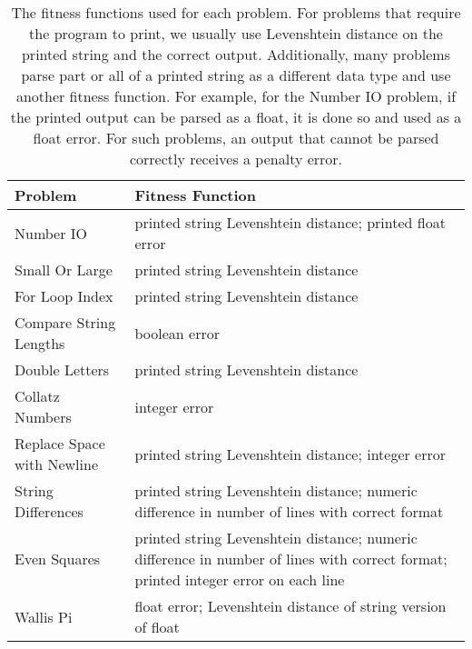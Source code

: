 \documentclass{sig-alternate}
\begin{document}
\begin{table*}[t]
\centering
\caption{The fitness functions used for each problem. For problems that require the program to print, we usually use Levenshtein distance on the printed string and the correct output. Additionally, many problems parse part or all of a printed string as a different data type and use another fitness function. For example, for the Number IO problem, if the printed output can be parsed as a float, it is done so and used as a float error. For such problems, an output that cannot be parsed correctly receives a penalty error.}
\label{tableFitnessFunctions}
\begin{tabular}{>{\raggedright}p{4cm} >{\raggedright}p{11cm}}
\toprule
\textbf{Problem}               & \textbf{Fitness Function}                                                                                                                        \tabularnewline
\midrule
Number IO                  & printed string Levenshtein distance; printed float error                                                                              \tabularnewline
Small Or Large             & printed string Levenshtein distance                                                                                                   \tabularnewline
For Loop Index             & printed string Levenshtein distance                                                                                                   \tabularnewline
Compare String Lengths     & boolean error                                                                                                                  \tabularnewline
Double Letters             & printed string Levenshtein distance                                                                                                   \tabularnewline
Collatz Numbers            & integer error                                                                                                                  \tabularnewline
Replace Space with Newline & printed string Levenshtein distance; integer error                                                                                    \tabularnewline
String Differences         & printed string Levenshtein distance; numeric difference in number of lines with correct format                                                \tabularnewline
Even Squares               & printed string Levenshtein distance; numeric difference in number of lines with correct format; printed integer error on each line                        \tabularnewline
Wallis Pi                  & float error; Levenshtein distance of string version of float                                                                          \tabularnewline

\end{tabular}
\end{table*}
\end{document}
